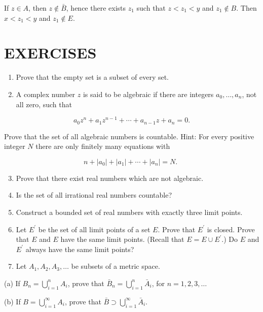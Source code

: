 \documentclass[10pt]{article}
\begin{document}
If $z \in A$, then $z \notin \bar{B}$, hence there exists $z_{1}$ such that $z<z_{1}<y$ and $z_{1} \notin B$. Then $x<z_{1}<y$ and $z_{1} \notin E$.

\section{EXERCISES}
\begin{enumerate}
  \item Prove that the empty set is a subset of every set.

  \item A complex number $z$ is said to be algebraic if there are integers $a_{0}, \ldots, a_{n}$, not all zero, such that

\end{enumerate}

$$
a_{0} z^{n}+a_{1} z^{n-1}+\cdots+a_{n-1} z+a_{n}=0 .
$$

Prove that the set of all algebraic numbers is countable. Hint: For every positive integer $N$ there are only finitely many equations with

$$
n+\left|a_{0}\right|+\left|a_{1}\right|+\cdots+\left|a_{n}\right|=N \text {. }
$$

\begin{enumerate}
  \setcounter{enumi}{2}
  \item Prove that there exist real numbers which are not algebraic.

  \item Is the set of all irrational real numbers countable?

  \item Construct a bounded set of real numbers with exactly three limit points.

  \item Let $E^{\prime}$ be the set of all limit points of a set $E$. Prove that $E^{\prime}$ is closed. Prove that $E$ and $E$ have the same limit points. (Recall that $E=E \cup E^{\prime}$.) Do $E$ and $E^{\prime}$ always have the same limit points?

  \item Let $A_{1}, A_{2}, A_{3}, \ldots$ be subsets of a metric space.

\end{enumerate}

(a) If $B_{n}=\bigcup_{i=1}^{n} A_{i}$, prove that $\bar{B}_{n}=\bigcup_{i=1}^{n} \bar{A}_{i}$, for $n=1,2,3, \ldots$

(b) If $B=\bigcup_{i=1}^{\infty} A_{i}$, prove that $\bar{B} \supset \bigcup_{i=1}^{\infty} \bar{A}_{i}$.
\end{document}
